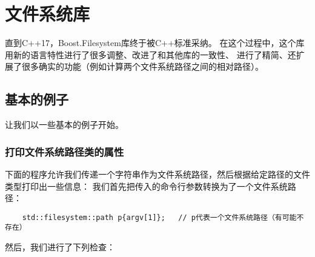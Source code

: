 \section{文件系统库}\label{ch20}
直到C++17，Boost.Filesystem库终于被C++标准采纳。
在这个过程中，这个库用新的语言特性进行了很多调整、改进了和其他库的一致性、
进行了精简、还扩展了很多确实的功能（例如计算两个文件系统路径之间的相对路径）。

\subsection{基本的例子}
让我们以一些基本的例子开始。

\subsubsection{打印文件系统路径类的属性}
下面的程序允许我们传递一个字符串作为文件系统路径，然后根据给定路径的文件类型打印出一些信息：
我们首先把传入的命令行参数转换为了一个文件系统路径：
\begin{lstlisting}
    std::filesystem::path p{argv[1]};   // p代表一个文件系统路径（有可能不存在）
\end{lstlisting}
然后，我们进行了下列检查：
